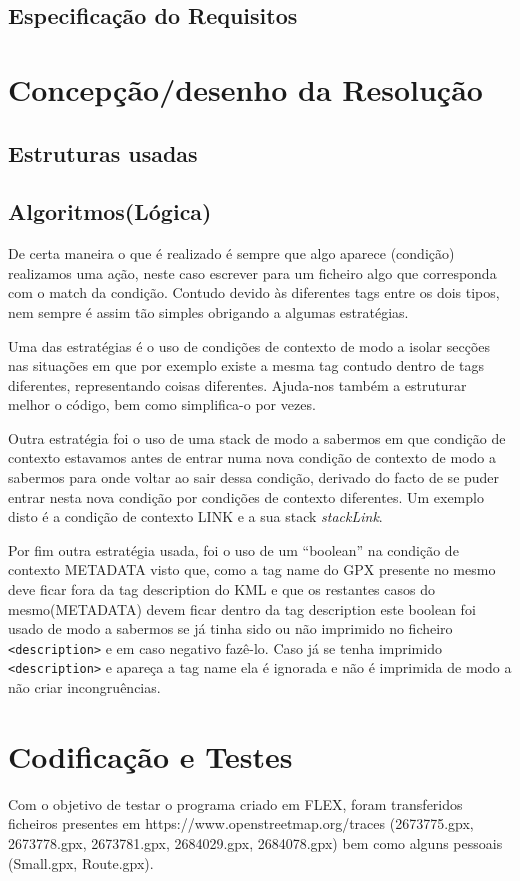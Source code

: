 \documentclass{llncs}
\begin{document}
\subsection{Especificação do Requisitos}

\section{Concepção/desenho da Resolução}
\subsection{Estruturas usadas}

\subsection{Algoritmos(Lógica)}
De certa maneira o que é realizado é sempre que algo aparece (condição) realizamos uma ação, neste caso escrever para um ficheiro algo que corresponda com o match da condição. Contudo devido às diferentes tags entre os dois tipos, nem sempre é assim tão simples obrigando a algumas estratégias.

Uma das estratégias é o uso de condições de contexto de modo a isolar secções nas situações em que por exemplo existe a mesma tag contudo dentro de tags diferentes, representando coisas diferentes. Ajuda-nos também a estruturar melhor o código, bem como simplifica-o por vezes.

Outra estratégia foi o uso de uma stack de modo a sabermos em que condição de contexto estavamos antes de entrar numa nova condição de contexto de modo a sabermos para onde voltar ao sair dessa condição, derivado do facto de se puder entrar nesta nova condição por condições de contexto diferentes. Um exemplo disto é a condição de contexto LINK e a sua stack \textit{stackLink}.

Por fim outra estratégia usada, foi o uso de um ``boolean'' na condição de contexto METADATA visto que, como a tag name do GPX presente no mesmo deve ficar fora da tag description do KML e que os restantes casos do mesmo(METADATA) devem ficar dentro da tag description este boolean foi usado de modo a sabermos se já tinha sido ou não imprimido no ficheiro \verb|<description>| e em caso negativo fazê-lo. Caso já se tenha imprimido \verb|<description>| e apareça a tag name ela é ignorada e não é imprimida de modo a não criar incongruências.

\section{Codificação e Testes}
Com o objetivo de testar o programa criado em FLEX, foram transferidos ficheiros presentes em https://www.openstreetmap.org/traces (2673775.gpx, 2673778.gpx, 2673781.gpx, 2684029.gpx, 2684078.gpx) bem como alguns pessoais (Small.gpx, Route.gpx).
\end{document}
